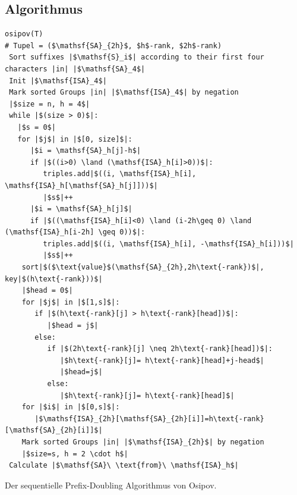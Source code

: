 \subsection{Algorithmus}
\begin{listing}
\begin{verbatim}
osipov(T)
# Tupel = ($\mathsf{SA}_{2h}$, $h$-rank, $2h$-rank)
 Sort suffixes |$\mathsf{S}_i$| according to their first four characters |in| |$\mathsf{SA}_4$| 
 Init |$\mathsf{ISA}_4$| 
 Mark sorted Groups |in| |$\mathsf{ISA}_4$| by negation
 |$size = n, h = 4$| 
 while |$(size > 0)$|:  
   |$s = 0$|
   for |$j$| in |$[0, size]$|:
      |$i = \mathsf{SA}_h[j]-h$|
      if |$((i>0) \land (\mathsf{ISA}_h[i]>0))$|:
         triples.add|$((i, \mathsf{ISA}_h[i], \mathsf{ISA}_h[\mathsf{SA}_h[j]]))$|
         |$s$|++
      |$i = \mathsf{SA}_h[j]$|
      if |$((\mathsf{ISA}_h[i]<0) \land (i-2h\geq 0) \land (\mathsf{ISA}_h[i-2h] \geq 0))$|:
         triples.add|$((i, \mathsf{ISA}_h[i], -\mathsf{ISA}_h[i]))$|
         |$s$|++
    sort|$($\text{value}$(\mathsf{SA}_{2h},2h\text{-rank})$|, key|$(h\text{-rank}))$|
    |$head = 0$|
    for |$j$| in |$[1,s]$|:
       if |$(h\text{-rank}[j] > h\text{-rank}[head])$|:
          |$head = j$|
       else:
          if |$(2h\text{-rank}[j] \neq 2h\text{-rank}[head])$|:
             |$h\text{-rank}[j]= h\text{-rank}[head]+j-head$|
             |$head=j$|
          else:
             |$h\text{-rank}[j]= h\text{-rank}[head]$|
    for |$i$| in |$[0,s]$|:
       |$\mathsf{ISA}_{2h}[\mathsf{SA}_{2h}[i]]=h\text{-rank}[\mathsf{SA}_{2h}[i]]$|
    Mark sorted Groups |in| |$\mathsf{ISA}_{2h}$| by negation
    |$size=s, h = 2 \cdot h$| 
 Calculate |$\mathsf{SA}\ \text{from}\ \mathsf{ISA}_h$|
\end{verbatim}
\caption{Der sequentielle Prefix-Doubling Algorithmus von Osipov.}
\label{alg:osipov}
\end{listing}


